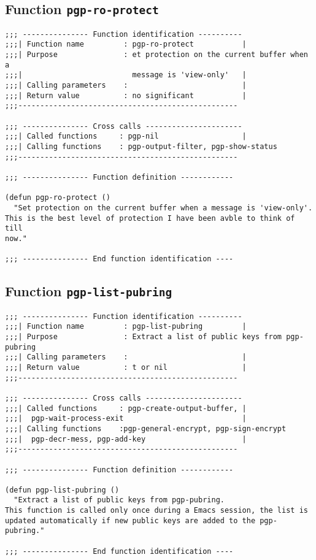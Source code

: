\subsection{Function {\tt pgp-ro-protect}}
\leavevmode
\begin{verbatim}
;;; --------------- Function identification ----------
;;;| Function name         : pgp-ro-protect           |
;;;| Purpose               : et protection on the current buffer when a
;;;|                         message is 'view-only'   |
;;;| Calling parameters    :                          |
;;;| Return value          : no significant           |
;;;--------------------------------------------------

;;; --------------- Cross calls ----------------------
;;;| Called functions     : pgp-nil                   |
;;;| Calling functions    : pgp-output-filter, pgp-show-status
;;;--------------------------------------------------

;;; --------------- Function definition ------------

(defun pgp-ro-protect ()
  "Set protection on the current buffer when a message is 'view-only'.
This is the best level of protection I have been avble to think of till
now."

;;; --------------- End function identification ----
\end{verbatim}
\subsection{Function {\tt pgp-list-pubring}}
\leavevmode
\begin{verbatim}
;;; --------------- Function identification ----------
;;;| Function name         : pgp-list-pubring         |
;;;| Purpose               : Extract a list of public keys from pgp-pubring
;;;| Calling parameters    :                          |
;;;| Return value          : t or nil                 |
;;;--------------------------------------------------

;;; --------------- Cross calls ----------------------
;;;| Called functions     : pgp-create-output-buffer, |
;;;|  pgp-wait-process-exit                           |
;;;| Calling functions    :pgp-general-encrypt, pgp-sign-encrypt
;;;|  pgp-decr-mess, pgp-add-key                      |
;;;--------------------------------------------------

;;; --------------- Function definition ------------

(defun pgp-list-pubring ()
  "Extract a list of public keys from pgp-pubring.
This function is called only once during a Emacs session, the list is
updated automatically if new public keys are added to the pgp-pubring."

;;; --------------- End function identification ----
\end{verbatim}
